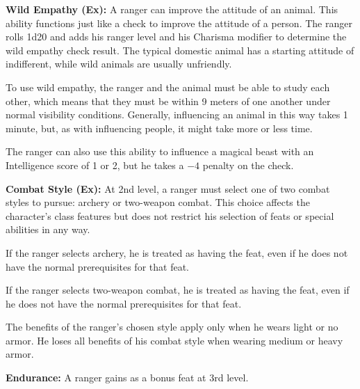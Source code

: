 
\textbf{Wild Empathy (Ex):} A ranger can improve the attitude of an animal. This ability functions just like a  check to improve the attitude of a person. The ranger rolls 1d20 and adds his ranger level and his Charisma modifier to determine the wild empathy check result. The typical domestic animal has a starting attitude of indifferent, while wild animals are usually unfriendly.

To use wild empathy, the ranger and the animal must be able to study each other, which means that they must be within 9 meters of one another under normal visibility conditions. Generally, influencing an animal in this way takes 1 minute, but, as with influencing people, it might take more or less time.

The ranger can also use this ability to influence a magical beast with an Intelligence score of 1 or 2, but he takes a $-4$ penalty on the check.

\textbf{Combat Style (Ex):} At 2nd level, a ranger must select one of two combat styles to pursue: archery or two-weapon combat. This choice affects the character's class features but does not restrict his selection of feats or special abilities in any way.

If the ranger selects archery, he is treated as having the  feat, even if he does not have the normal prerequisites for that feat.

If the ranger selects two-weapon combat, he is treated as having the  feat, even if he does not have the normal prerequisites for that feat.

The benefits of the ranger's chosen style apply only when he wears light or no armor. He loses all benefits of his combat style when wearing medium or heavy armor.

\textbf{Endurance:} A ranger gains  as a bonus feat at 3rd level.

